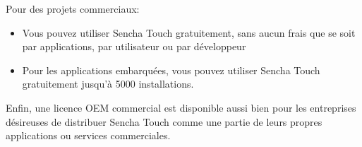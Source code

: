 Pour des projets commerciaux:
\begin{itemize}
  \item[\textbullet]
  Vous pouvez utiliser Sencha Touch gratuitement, sans aucun frais que se soit par applications, par utilisateur ou par développeur

  \item[\textbullet]
  Pour les applications embarquées, vous pouvez utiliser Sencha Touch gratuitement jusqu’à 5000 installations.

\end{itemize}
  
Enfin, une licence OEM commercial est disponible aussi bien pour les entreprises désireuses de distribuer Sencha Touch comme une partie de leurs propres applications ou services commerciales.



